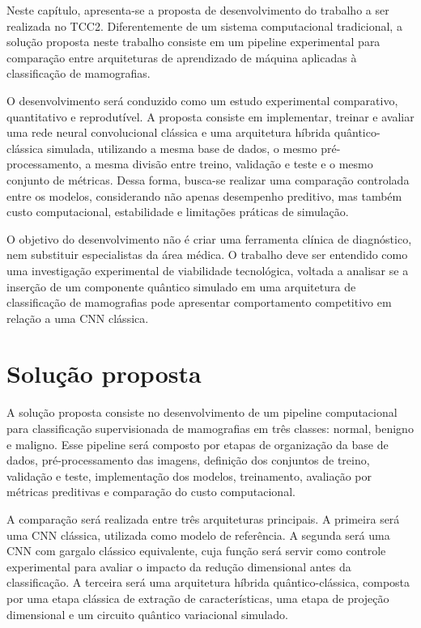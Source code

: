 \documentclass[
    12pt,
    openright,
    oneside,
    a4paper,
    english,
    brazil
]{abntex2}
\begin{document}
Neste capítulo, apresenta-se a proposta de desenvolvimento do trabalho a ser realizada no TCC2. Diferentemente de um sistema computacional tradicional, a solução proposta neste trabalho consiste em um pipeline experimental para comparação entre arquiteturas de aprendizado de máquina aplicadas à classificação de mamografias.

O desenvolvimento será conduzido como um estudo experimental comparativo, quantitativo e reprodutível. A proposta consiste em implementar, treinar e avaliar uma rede neural convolucional clássica e uma arquitetura híbrida quântico-clássica simulada, utilizando a mesma base de dados, o mesmo pré-processamento, a mesma divisão entre treino, validação e teste e o mesmo conjunto de métricas. Dessa forma, busca-se realizar uma comparação controlada entre os modelos, considerando não apenas desempenho preditivo, mas também custo computacional, estabilidade e limitações práticas de simulação.

O objetivo do desenvolvimento não é criar uma ferramenta clínica de diagnóstico, nem substituir especialistas da área médica. O trabalho deve ser entendido como uma investigação experimental de viabilidade tecnológica, voltada a analisar se a inserção de um componente quântico simulado em uma arquitetura de classificação de mamografias pode apresentar comportamento competitivo em relação a uma CNN clássica.

\section{Solução proposta}
\label{sec:solucao}

A solução proposta consiste no desenvolvimento de um pipeline computacional para classificação supervisionada de mamografias em três classes: normal, benigno e maligno. Esse pipeline será composto por etapas de organização da base de dados, pré-processamento das imagens, definição dos conjuntos de treino, validação e teste, implementação dos modelos, treinamento, avaliação por métricas preditivas e comparação do custo computacional.

A comparação será realizada entre três arquiteturas principais. A primeira será uma CNN clássica, utilizada como modelo de referência. A segunda será uma CNN com gargalo clássico equivalente, cuja função será servir como controle experimental para avaliar o impacto da redução dimensional antes da classificação. A terceira será uma arquitetura híbrida quântico-clássica, composta por uma etapa clássica de extração de características, uma etapa de projeção dimensional e um circuito quântico variacional simulado.
\end{document}
